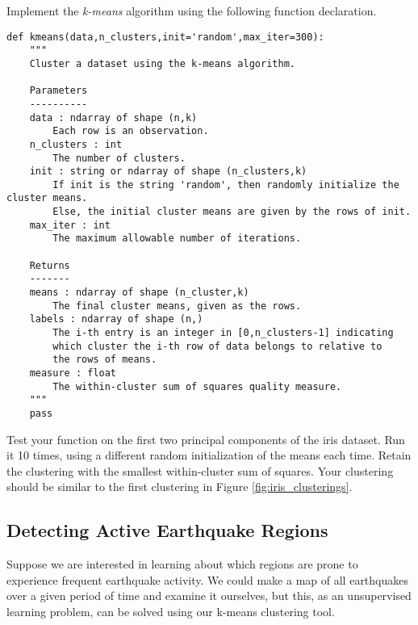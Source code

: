 \begin{problem}
Implement the \emph{k-means} algorithm using the following function declaration.

\begin{lstlisting}
def kmeans(data,n_clusters,init='random',max_iter=300):
    """
    Cluster a dataset using the k-means algorithm.

    Parameters
    ----------
    data : ndarray of shape (n,k)
        Each row is an observation.
    n_clusters : int
        The number of clusters.
    init : string or ndarray of shape (n_clusters,k)
        If init is the string 'random', then randomly initialize the cluster means.
        Else, the initial cluster means are given by the rows of init.
    max_iter : int
        The maximum allowable number of iterations.

    Returns
    -------
    means : ndarray of shape (n_cluster,k)
        The final cluster means, given as the rows.
    labels : ndarray of shape (n,)
        The i-th entry is an integer in [0,n_clusters-1] indicating
        which cluster the i-th row of data belongs to relative to
        the rows of means.
    measure : float
        The within-cluster sum of squares quality measure.
    """
    pass
\end{lstlisting}

Test your function on the first two principal components of the iris dataset.
Run it 10 times, using a different random initialization of the means each time.
Retain the clustering with the smallest within-cluster sum of squares.
Your clustering should be similar to the first clustering in Figure \ref{fig:iris_clusterings}.
\end{problem}

\subsection*{Detecting Active Earthquake Regions}
Suppose we are interested in learning about which regions are prone to experience frequent earthquake activity.
We could make a map of all earthquakes over a given period of time and examine it ourselves, but this, as an unsupervised learning problem, can be solved using our k-means clustering tool.

